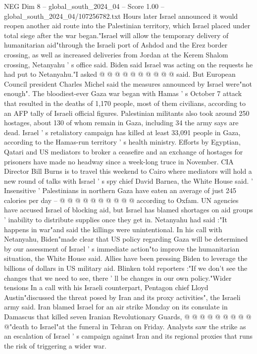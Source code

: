 \begin{textsample}{NEG Dim 8 – global\_south\_2024\_04 – Score 1.00 – global\_south\_2024\_04/107256782.txt}
Hours later Israel announced it would reopen another aid route into the Palestinian territory, which Israel placed under total siege after the war began."Israel will allow the temporary delivery of humanitarian aid"through the Israeli port of Ashdod and the Erez border crossing, as well as increased deliveries from Jordan at the Kerem Shalom crossing, Netanyahu ' s office said.
Biden said Israel was acting on the requests he had put to Netanyahu."I asked @ @ @ @ @ @ @ @ @ @ said.
But European Council president Charles Michel said the measures announced by Israel were"not enough".
The bloodiest-ever Gaza war began with Hamas ' s October 7 attack that resulted in the deaths of 1,170 people, most of them civilians, according to an AFP tally of Israeli official figures.
Palestinian militants also took around 250 hostages, about 130 of whom remain in Gaza, including 34 the army says are dead.
Israel ' s retaliatory campaign has killed at least 33,091 people in Gaza, according to the Hamas-run territory ' s health ministry.
Efforts by Egyptian, Qatari and US mediators to broker a ceasefire and an exchange of hostages for prisoners have made no headway since a week-long truce in November.
CIA Director Bill Burns is to travel this weekend to Cairo where mediators will hold a new round of talks with Israel ' s spy chief David Barnea, the White House said. ' Insensitive ' Palestinians in northern Gaza have eaten an average of just 245 calories per day -- @ @ @ @ @ @ @ @ @ @ according to Oxfam.
UN agencies have accused Israel of blocking aid, but Israel has blamed shortages on aid groups ' inability to distribute supplies once they get in.
Netanyahu had said :"It happens in war"and said the killings were unintentional.
In his call with Netanyahu, Biden"made clear that US policy regarding Gaza will be determined by our assessment of Israel ' s immediate action"to improve the humanitarian situation, the White House said.
Allies have been pressing Biden to leverage the billions of dollars in US military aid.
Blinken told reporters :"If we don't see the changes that we need to see, there ' ll be changes in our own policy."Wider tensions In a call with his Israeli counterpart, Pentagon chief Lloyd Austin"discussed the threat posed by Iran and its proxy activities", the Israeli army said.
Iran blamed Israel for an air strike Monday on its consulate in Damascus that killed seven Iranian Revolutionary Guards, @ @ @ @ @ @ @ @ @ @"death to Israel"at the funeral in Tehran on Friday.
Analysts saw the strike as an escalation of Israel ' s campaign against Iran and its regional proxies that runs the risk of triggering a wider war.

\end{textsample}
